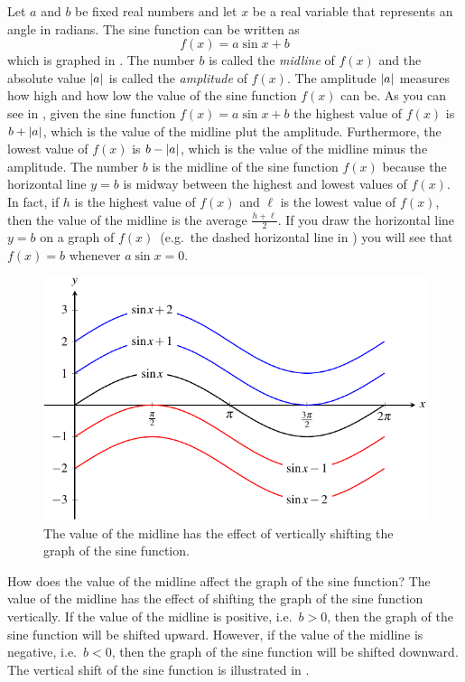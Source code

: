 \documentclass[a4paper,oneside,12pt]{article}
\begin{document}
Let $a$ and $b$ be fixed real numbers and let $x$ be a real variable
that represents an angle in radians.  The sine function can be written
as
\[
f(x)
=
a \sin x + b
\]
which is graphed in .  The
number $b$ is called the \emph{midline} of $f(x)$ and the absolute
value $\lvert a\rvert$ is called the \emph{amplitude} of $f(x)$.
The amplitude $\lvert a\rvert$ measures how high and how low the
value of the sine function $f(x)$ can be.  As you can see in
, given the sine function
$f(x) = a \sin x + b$ the highest value of $f(x)$ is
$b + \lvert a\rvert$, which is the value of the midline plut the
amplitude.  Furthermore, the lowest value of $f(x)$ is
$b - \lvert a\rvert$, which is the value of the midline minus the
amplitude.  The number $b$ is the midline of the sine function $f(x)$
because the horizontal line $y = b$ is midway between the highest and
lowest values of $f(x)$.  In fact, if $h$ is the highest value of
$f(x)$ and $\ell$ is the lowest value of $f(x)$, then the value of the
midline is the average $\frac{h + \ell}{2}$.  If you draw the
horizontal line $y = b$ on a graph of $f(x)$~(e.g.~the dashed
horizontal line in ) you will
see that $f(x) = b$ whenever $a \sin x = 0$.

\begin{figure}[!htbp]
\centering
\includegraphics[scale=1.1]{image/13/sin-vertical-shift.pdf}
\caption{%
  The value of the midline has the effect of vertically shifting the
  graph of the sine function.
}
\label{fig:trigonometric:sine_vertical_shift}
\end{figure}

How does the value of the midline affect the graph of the sine
function?  The value of the midline has the effect of shifting the
graph of the sine function vertically.  If the value of the midline is
positive, i.e.~$b > 0$, then the graph of the sine function will be
shifted upward.  However, if the value of the midline is negative,
i.e.~$b < 0$, then the graph of the sine function will be shifted
downward.  The vertical shift of the sine function is illustrated in
.
\end{document}
